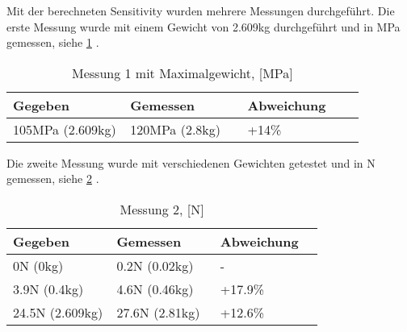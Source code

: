 

Mit der berechneten Sensitivity wurden mehrere Messungen durchgeführt.
Die erste Messung wurde mit einem Gewicht von 2.609kg durchgeführt und in MPa gemessen, siehe \ref{tbl:biegebalkenmessungeins} .

\bgroup
\def\arraystretch{2}
\begin{table}[h]
\centering
\begin{tabular}{|p{0.33\linewidth}|p{0.33\linewidth}|p{0.33\linewidth}|}
\hline
Gegeben & Gemessen & Abweichung \\ \hline
105MPa (2.609kg) & 120MPa (2.8kg) & +14\% \\ \hline
\end{tabular}
\caption{Messung 1 mit Maximalgewicht, [MPa]}
\label{tbl:biegebalkenmessungeins}

\end{table}
\egroup

Die zweite Messung wurde mit verschiedenen Gewichten getestet und in N gemessen, siehe \ref{tbl:biegebalkenmessungzwei} .
\bgroup
\def\arraystretch{2}
\begin{table}[h]
\centering
\begin{tabular}{|p{0.33\linewidth}|p{0.33\linewidth}|p{0.33\linewidth}|}
\hline
Gegeben & Gemessen & Abweichung \\ \hline
0N (0kg) & 0.2N (0.02kg) & - \\ \hline
3.9N (0.4kg) & 4.6N (0.46kg) & +17.9\%  \\ \hline
24.5N (2.609kg) & 27.6N (2.81kg)  & +12.6\% \\ \hline
\end{tabular}
\caption{Messung 2, [N]}
\label{tbl:biegebalkenmessungzwei}

\end{table}
\egroup
